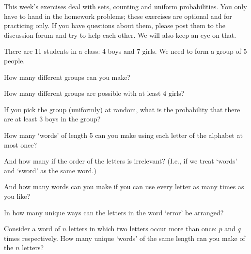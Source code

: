 \documentclass[a4paper,10pt,landscape,twocolumn]{scrartcl}
\begin{document}
\practiceproblems

{\sffamily\noindent
This week's exercises deal with sets, counting and uniform probabilities. You only have to hand in the homework problems; these exercises are optional and for practicing only. If you have questions about them, please post them to the discussion forum and try to help each other. We will also keep an eye on that.
}

\begin{exercise}[]
	There are 11 students in a class: 4 boys and 7 girls. We need to form a group of 5 people.
	
	\begin{subex}
		How many different groups can you make?	
	\end{subex}

	 \begin{subex}
	 		How many different groups are possible with at least 4 girls?
	 \end{subex}
	 
	 \begin{subex}
		If you pick the group (uniformly) at random, what is the probability that there are at least 3 boys in the group?
	 \end{subex}
\end{exercise}

\begin{exercise}[Words]
	\begin{subex}
	How many `words' of length 5 can you make using each letter of the alphabet at most once?
	\end{subex}
	
	\begin{subex}
	And how many if the order of the letters is irrelevant? (I.e., if we treat `words'  and `sword' as the same word.)
	\end{subex}
	
	\begin{subex}
	And how many words can you make if you can use every letter as many times as you like?	
	\end{subex}

	\begin{subex}
	In how many unique ways can the letters in the word `error' be arranged?
	\end{subex}

	\begin{subex}
	 Consider a word of $n$ letters in which two letters occur more than once: $p$ and $q$ times respectively. How many unique `words' of the same length can you make of the $n$ letters?
	\end{subex}
\end{exercise}
\end{document}
